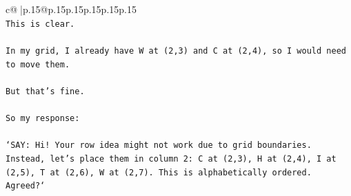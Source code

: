\documentclass{article}
\begin{document}
{\begin{supertabular}{c@{$\;$}|p{.15\linewidth}@{}p{.15\linewidth}p{.15\linewidth}p{.15\linewidth}p{.15\linewidth}p{.15\linewidth}}
{{{\\ 
\texttt{This is clear.} \\
\\ 
\texttt{In my grid, I already have W at (2,3) and C at (2,4), so I would need to move them.} \\
\\ 
\texttt{But that's fine.} \\
\\ 
\texttt{So my response:} \\
\\ 
\texttt{`SAY: Hi! Your row idea might not work due to grid boundaries. Instead, let's place them in column 2: C at (2,3), H at (2,4), I at (2,5), T at (2,6), W at (2,7). This is alphabetically ordered. Agreed?`} \\
            }
        }
    }
     \\ \\


\end{supertabular}}
\end{document}
